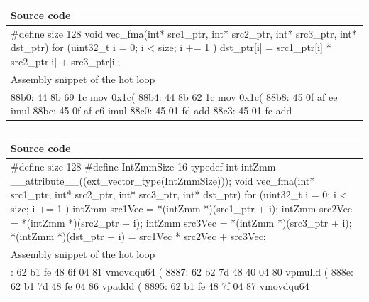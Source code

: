 \documentclass[logo,bsc,singlespacing,parskip]{infthesis}
\newenvironment{VerbatimCompact}
  {\vspace*{-2.5mm}\VerbatimEnvironment
   \par\Verbatim}
  {\endVerbatim\vspace*{-2.4mm}}
\begin{document}
\begin{table}[ht]\captionsetup{name=Listing}
\begin{tabular}{>{\raggedright\arraybackslash}p{14cm}}
    Source code\\
    \midrule
    \begin{VerbatimCompact}
#define size 128
void vec_fma(int* src1_ptr, int* src2_ptr, 
             int* src3_ptr, int* dst_ptr) {
    for (uint32_t i = 0; i < size; i += 1 ){
        dst_ptr[i] = src1_ptr[i] * src2_ptr[i] + src3_ptr[i];
    }
}
    \end{VerbatimCompact}
    \\
    Assembly snippet of the hot loop\\
    \midrule
    \begin{VerbatimCompact}
88b0: 44 8b 69 1c  mov    0x1c(%
88b4: 44 8b 62 1c  mov    0x1c(%
88b8: 45 0f af ee  imul   %
88bc: 45 0f af e6  imul   %
88c0: 45 01 fd     add    %
88c3: 45 01 fc     add    %
    \end{VerbatimCompact}
    \\
\end{tabular}
\caption{}
\label{vec-fma-int-auto}
\end{table}

\begin{table}[H]\captionsetup{name=Listing}
\begin{tabular}{>{\raggedright\arraybackslash}p{14cm}}
    Source code\\
    \midrule
    \begin{VerbatimCompact}
#define size 128
#define IntZmmSize 16
typedef int intZmm __attribute__((ext_vector_type(IntZmmSize)));
void vec_fma(int* src1_ptr, int* src2_ptr,
             int* src3_ptr, int* dst_ptr) {
    for (uint32_t i = 0; i < size; i += 1 ){
        intZmm src1Vec = *(intZmm *)(src1_ptr + i);
        intZmm src2Vec = *(intZmm *)(src2_ptr + i);
        intZmm src3Vec = *(intZmm *)(src3_ptr + i);
        *(intZmm *)(dst_ptr + i) = src1Vec * src2Vec + src3Vec;
    }
}
    \end{VerbatimCompact}
    \\
    Assembly snippet of the hot loop\\
    \midrule
    \begin{VerbatimCompact}
8880: 62 b1 fe 48 6f 04 81  vmovdqu64 (%
8887: 62 b2 7d 48 40 04 80  vpmulld (%
888e: 62 b1 7d 48 fe 04 86  vpaddd (%
8895: 62 b1 fe 48 7f 04 87  vmovdqu64 %
    \end{VerbatimCompact}
    \\
\end{tabular}
\caption{}
\label{vec-fma-int-vecty}
\end{table}
\end{document}
